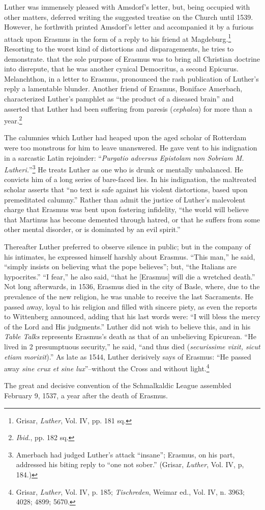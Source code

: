 Luther was immensely pleased with Amsdorf’s letter, but, being
occupied with other matters, deferred writing the suggested treatise
on the Church until 1539. However, he forthwith printed Amsdorf’s
letter and accompanied it by a furious attack upon Erasmus in the
form of a reply to his friend at Magdeburg.\footnote{Grisar, \textit{Luther}, Vol. IV, pp. 181 sq.}
 Resorting to the worst
kind of distortions and disparagements, he tries to demonstrate. that
the sole purpose of Erasmus was to bring all Christian doctrine into
disrepute, that he was another cynical Democritus, a second Epicurus.
Melanchthon, in a letter to Erasmus, pronounced the rash publication
of Luther’s reply a lamentable blunder. Another friend of Erasmus,
Boniface Amerbach, characterized Luther’s pamphlet as “the product
of a diseased brain” and asserted that Luther had been suffering
from paresis (\textit{cephalea}) for more than a year.\footnote{\textit{Ibid.}, pp. 182 sq.}


The calumnies which Luther had heaped upon the aged scholar of
Rotterdam were too monstrous for him to leave unanswered. He gave
vent to his indignation in a sarcastic Latin rejoinder: “\textit{Purgatio adversus
Epistolam non Sobriam M. Lutheri.}”\footnote
{Amerbach had judged Luther’s attack “insane”; Erasmus, on his part, addressed his
biting reply to “one not sober.” (Grisar, \textit{Luther}, Vol. IV, p, 184.)}
He treats Luther as one
who is drunk or mentally unbalanced. He convicts him of a long
series of bare-faced lies. In his indignation, the maltreated scholar
asserts that “no text is safe against his violent distortions, based upon
premeditated calumny.” Rather than admit the justice of Luther’s
malevolent charge that Erasmus was bent upon fostering infidelity,
“the world will believe that Martinus has become demented through
hatred, or that he suffers from some other mental disorder, or is dominated
by an evil spirit.”

Thereafter Luther preferred to observe silence in public; but in the company
of his intimates, he expressed himself harshly about Erasmus. “This
man,” he said, “simply insists on believing what the pope believes”; but,
“the Italians are hypocrites.” “I fear,” he also said, “that he [Erasmus] will
die a wretched death.” Not long afterwards, in 1536, Erasmus died in the
city of Basle, where, due to the prevalence of the new religion, he was unable
to receive the last Sacraments. He passed away, loyal to his religion and
filled with sincere piety, as even the reports to Wittenberg announced, adding
that his last words were: “I will bless the mercy of the Lord and His
judgments.” Luther did not wish to believe this, and in his \textit{Table Talks}
represents Erasmus’s death as that of an unbelieving Epicurean. “He lived
in 2 presumptuous security,” he said, “and thus died (\textit{securissime vixit,
sicut etiam morixit}).” As late as 1544, Luther derisively says of Erasmus:
“He passed away \textit{sine crux et sine lux}”--without the Cross and without
light.\footnote
{Grisar, \textit{Luther}, Vol. IV, p. 185; \textit{Tischreden}, Weimar ed., Vol. IV, n. 3963; 4028; 4899;
5670.}

The great and decisive convention of the Schmalkaldic League assembled
February 9, 1537, a year after the death of Erasmus.
